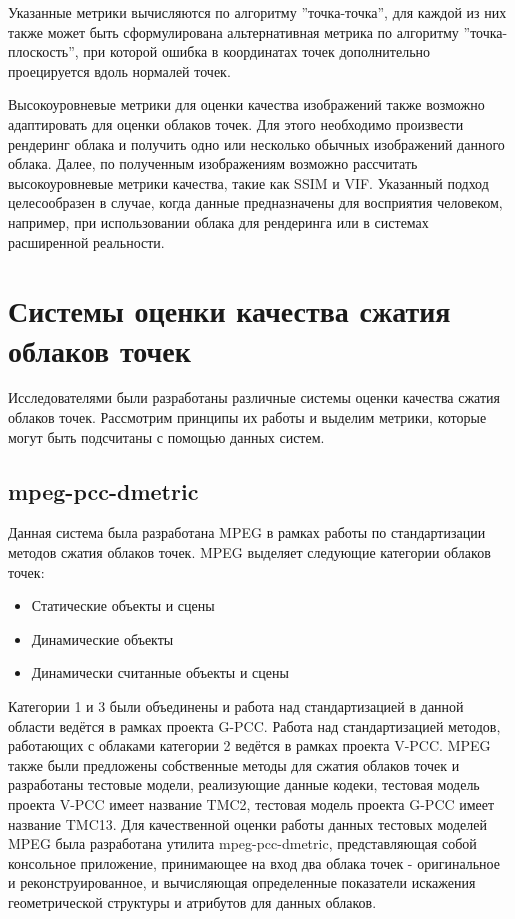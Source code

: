 Указанные метрики вычисляются по алгоритму ''точка-точка'', для каждой из них
также может быть сформулирована альтернативная метрика по алгоритму
''точка-плоскость'', при которой ошибка в координатах точек дополнительно
проецируется вдоль нормалей точек.


Высокоуровневые метрики для оценки качества изображений также возможно
адаптировать для оценки облаков точек. Для этого необходимо произвести рендеринг
облака и получить одно или несколько обычных изображений данного облака. Далее,
по полученным изображениям возможно рассчитать высокоуровневые метрики качества,
такие как SSIM и VIF. Указанный подход целесообразен в случае, когда данные
предназначены для восприятия человеком, например, при использовании облака для
рендеринга или в системах расширенной реальности.

\section{Системы оценки качества сжатия облаков точек}

Исследователями были разработаны различные системы оценки качества сжатия
облаков точек. Рассмотрим принципы их работы и выделим метрики, которые могут
быть подсчитаны с помощью данных систем.

\subsection{mpeg-pcc-dmetric}

Данная система была разработана MPEG в рамках работы по стандартизации методов
сжатия облаков точек. MPEG выделяет следующие категории облаков
точек\cite{CallForProposalV2}:

\begin{itemize}
    \item Статические объекты и сцены
    \item Динамические объекты
    \item Динамически считанные объекты и сцены
\end{itemize}


Категории 1 и 3 были объединены и работа над стандартизацией в данной области
ведётся в рамках проекта G-PCC. Работа над стандартизацией методов, работающих с
облаками категории 2 ведётся в рамках проекта V-PCC. MPEG также были предложены
собственные методы для сжатия облаков точек и разработаны тестовые модели,
реализующие данные кодеки, тестовая модель проекта V-PCC имеет название TMC2,
тестовая модель проекта G-PCC имеет название TMC13. Для качественной оценки
работы данных тестовых моделей MPEG была разработана утилита mpeg-pcc-dmetric,
представляющая собой консольное приложение, принимающее на вход два облака точек
- оригинальное и реконструированное, и вычисляющая определенные показатели
искажения геометрической структуры и атрибутов для данных облаков.

